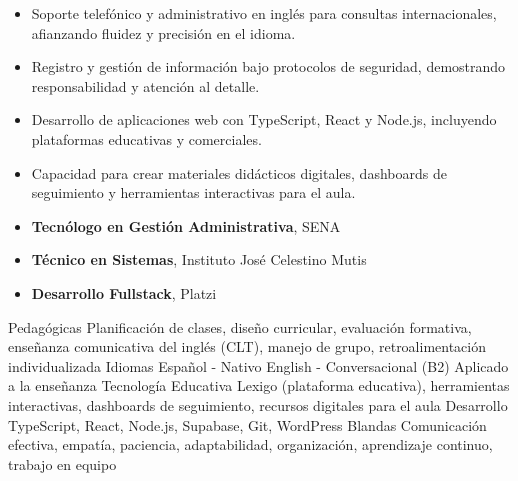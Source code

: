 \documentclass[11pt, a4paper]{awesome-cv}
\begin{document}
\begin{itemize}
  \item Soporte telefónico y administrativo en inglés para consultas internacionales, afianzando fluidez y precisión en el idioma.
  \item Registro y gestión de información bajo protocolos de seguridad, demostrando responsabilidad y atención al detalle.
\end{itemize}

\begin{itemize}
  \item Desarrollo de aplicaciones web con TypeScript, React y Node.js, incluyendo plataformas educativas y comerciales.
  \item Capacidad para crear materiales didácticos digitales, dashboards de seguimiento y herramientas interactivas para el aula.
\end{itemize}


\begin{itemize}
  \item \textbf{Tecnólogo en Gestión Administrativa}, SENA
  \item \textbf{Técnico en Sistemas}, Instituto José Celestino Mutis
  \item \textbf{Desarrollo Fullstack}, Platzi
\end{itemize}


\begin{cvskills}
  \cvskill
    {Pedagógicas}
    {Planificación de clases, diseño curricular, evaluación formativa, enseñanza comunicativa del inglés (CLT), manejo de grupo, retroalimentación individualizada}
  \cvskill
    {Idiomas}
    {Español - Nativo \quad English - Conversacional (B2) \quad Aplicado a la enseñanza}
  \cvskill
    {Tecnología Educativa}
    {Lexigo (plataforma educativa), herramientas interactivas, dashboards de seguimiento, recursos digitales para el aula}
  \cvskill
    {Desarrollo}
    {TypeScript, React, Node.js, Supabase, Git, WordPress}
  \cvskill
    {Blandas}
    {Comunicación efectiva, empatía, paciencia, adaptabilidad, organización, aprendizaje continuo, trabajo en equipo}
\end{cvskills}

\end{document}
